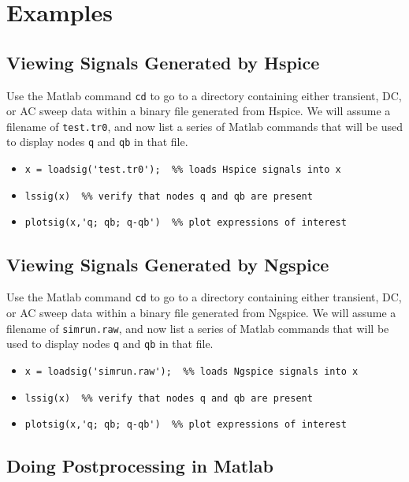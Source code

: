 \documentclass [dvips,12pt,cite]{article}
\begin{document}
\section*{Examples}

\subsection*{Viewing Signals Generated by Hspice}

  Use the Matlab command \verb|cd| to go to a directory containing
       either transient, DC, or AC sweep data within a binary file
       generated from Hspice.  We will assume a filename of
       \verb|test.tr0|, and now list a series of Matlab commands that
       will be used to display nodes \verb|q| and \verb|qb| in that
       file.
\begin{itemize}
  \item \verb|x = loadsig('test.tr0');  %% loads Hspice signals into x|
  \item \verb|lssig(x)  %% verify that nodes q and qb are present|
  \item \verb|plotsig(x,'q; qb; q-qb')  %% plot expressions of interest|
\end{itemize}

\subsection*{Viewing Signals Generated by Ngspice}

  Use the Matlab command \verb|cd| to go to a directory containing
       either transient, DC, or AC sweep data within a binary file
       generated from Ngspice.  We will assume a filename of
       \verb|simrun.raw|, and now list a series of Matlab commands
       that will be used to display nodes \verb|q| and \verb|qb| in
       that file.
\begin{itemize}
  \item \verb|x = loadsig('simrun.raw');  %% loads Ngspice signals into x|
  \item \verb|lssig(x)  %% verify that nodes q and qb are present|
  \item \verb|plotsig(x,'q; qb; q-qb')  %% plot expressions of interest|
\end{itemize}

\subsection*{Doing Postprocessing in Matlab}
\end{document}
